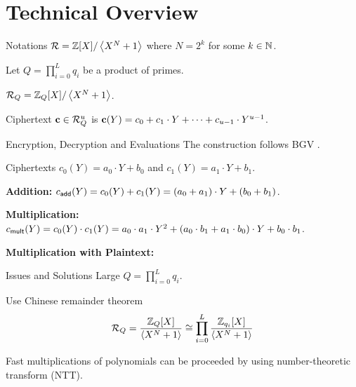 \section{Technical Overview}
\begin{frame}{Notations}
	$\mathcal{R} = \mathbb{Z}[X] / \left\langle X^N + 1\right\rangle$ where $N = 2^k$ for some $k \in \mathbb{N}$.
	
	Let $Q = \prod_{i = 0}^L q_i$ be a product of primes.
	
	$\mathcal{R}_Q = \mathbb{Z}_Q[X]/ \left\langle X^N + 1\right\rangle$.
	
	Ciphertext $\mathbf{c} \in \mathcal{R}_Q^u$ is $\mathbf{c}(Y) = c_0 + c_1 \cdot Y + \dots + c_{u - 1} \cdot Y^{u-1}$.
\end{frame}

\begin{frame}{Encryption, Decryption and Evaluations}
	The construction follows BGV \cite{ITCS:BraGenVai12}.
	
	Ciphertexts $c_0(Y) = a_0\cdot Y + b_0$ and $c_1(Y) = a_1 \cdot Y + b_1$.
	
	\textbf{Addition:} $c_{\mathsf{add}}(Y) = c_0(Y) + c_1(Y) = (a_0 + a_1)\cdot Y + (b_0 + b_1)$.
	
	\textbf{Multiplication:} $c_{\mathsf{mult}}(Y) = c_0(Y)\cdot c_1(Y) = a_0\cdot a_1 \cdot Y^2 + (a_0\cdot b_1 + a_1 \cdot b_0) \cdot Y + b_0\cdot b_1$.
	
	\textbf{Multiplication with Plaintext:} 
	
\end{frame}

\begin{frame}{Issues and Solutions}
	Large $Q = \prod_{i = 0}^L q_i$.
	
	Use Chinese remainder theorem
	\begin{equation*}
		\mathcal{R}_Q = \frac{\mathbb{Z}_Q[X]}{\left\langle X^N + 1\right\rangle} \cong \prod_{i = 0}^L \frac{\mathbb{Z}_{q_i}[X]}{\left\langle X^N + 1\right\rangle}
	\end{equation*}
	
	Fast multiplications of polynomials can be proceeded by using number-theoretic transform (NTT).
\end{frame}